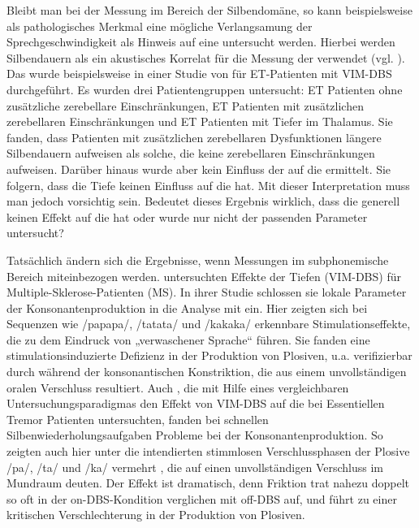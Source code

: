 Bleibt man bei der Messung im Bereich der Silbendomäne, so kann beispielsweise als pathologisches Merkmal eine mögliche Verlangsamung der Sprechgeschwindigkeit als Hinweis auf eine  untersucht werden. Hierbei werden Silbendauern als ein akustisches Korrelat für die Messung der  verwendet (vgl. \citealt{Crystal1990}). Das wurde beispielsweise in einer Studie von \citet{Kronenbuerger2009} für ET-Patienten mit VIM-DBS durchgeführt. Es wurden drei Patientengruppen untersucht: ET Patienten ohne zusätzliche zerebellare Einschränkungen, ET Patienten mit zusätzlichen zerebellaren Einschränkungen und ET Patienten mit Tiefer  im Thalamus. Sie fanden, dass Patienten mit zusätzlichen zerebellaren Dysfunktionen längere Silbendauern aufweisen als solche, die keine zerebellaren Einschränkungen aufweisen. Darüber hinaus wurde aber kein Einfluss der  auf die  ermittelt. Sie folgern, dass die Tiefe  keinen Einfluss auf die  hat. Mit dieser Interpretation muss man jedoch vorsichtig sein. Bedeutet dieses Ergebnis wirklich, dass die  generell keinen Effekt auf die  hat oder wurde nur nicht der passenden Parameter untersucht?

Tatsächlich ändern sich die Ergebnisse, wenn Messungen im subphonemische Bereich miteinbezogen werden. \citet{Pützer2007} untersuchten Effekte der Tiefen  (VIM-DBS) für Multiple-Sklerose-Patienten (MS). In ihrer Studie schlossen sie lokale Parameter der Konsonantenproduktion in die Analyse mit ein. Hier zeigten sich bei Sequenzen wie /papapa/, /tatata/ und /kakaka/ erkennbare Stimulationseffekte, die zu dem Eindruck von „verwaschener Sprache“ führen. Sie fanden eine stimulationsinduzierte Defizienz in der Produktion von Plosiven, u.a. verifizierbar durch  während der konsonantischen Konstriktion, die aus einem unvollständigen oralen Verschluss resultiert. Auch \citet{Mücke2014a}, die mit Hilfe eines vergleichbaren Untersuchungsparadigmas den Effekt von VIM-DBS auf die  bei Essentiellen Tremor Patienten untersuchten, fanden bei schnellen Silbenwiederholungsaufgaben Probleme bei der Konsonantenproduktion. So zeigten auch hier unter  die intendierten stimmlosen Verschlussphasen der Plosive /pa/, /ta/ und /ka/ vermehrt , die auf einen unvollständigen Verschluss im Mundraum deuten. Der Effekt ist dramatisch, denn Friktion trat nahezu doppelt so oft in der on-DBS-Kondition verglichen mit off-DBS auf, und führt zu einer kritischen Verschlechterung in der Produktion von Plosiven. 

